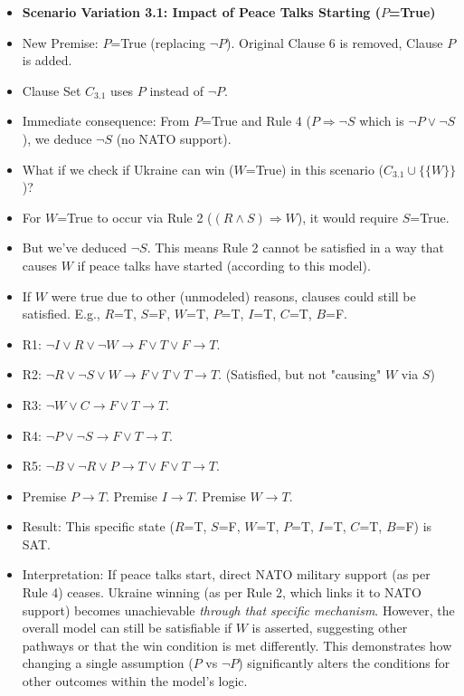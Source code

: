 \documentclass[11pt, a4paper]{article}
\begin{document}
\begin{itemize}
    \item \textbf{Scenario Variation 3.1: Impact of Peace Talks Starting ($P$=True)}
        \item New Premise: $P$=True (replacing $\neg P$). Original Clause 6 is removed, Clause $P$ is added.
        \item Clause Set $C_{3.1}$ uses $P$ instead of $\neg P$.
        \item Immediate consequence: From $P$=True and Rule 4 ($P \Rightarrow \neg S$ which is $\neg P \vee \neg S$), we deduce $\neg S$ (no NATO support).
        \item What if we check if Ukraine can win ($W$=True) in this scenario ($C_{3.1} \cup \{\{W\}\}$)?
            \item For $W$=True to occur via Rule 2 ($(R \wedge S) \Rightarrow W$), it would require $S$=True.
            \item But we've deduced $\neg S$. This means Rule 2 cannot be satisfied in a way that causes $W$ if peace talks have started (according to this model).
            \item If $W$ were true due to other (unmodeled) reasons, clauses could still be satisfied. E.g., $R$=T, $S$=F, $W$=T, $P$=T, $I$=T, $C$=T, $B$=F.
                \item R1: $\neg I \vee R \vee \neg W \rightarrow F \vee T \vee F \rightarrow T$.
                \item R2: $\neg R \vee \neg S \vee W \rightarrow F \vee T \vee T \rightarrow T$. (Satisfied, but not "causing" $W$ via $S$)
                \item R3: $\neg W \vee C \rightarrow F \vee T \rightarrow T$.
                \item R4: $\neg P \vee \neg S \rightarrow F \vee T \rightarrow T$.
                \item R5: $\neg B \vee \neg R \vee P \rightarrow T \vee F \vee T \rightarrow T$.
                \item Premise $P \rightarrow T$. Premise $I \rightarrow T$. Premise $W \rightarrow T$.
            \item Result: This specific state ($R$=T, $S$=F, $W$=T, $P$=T, $I$=T, $C$=T, $B$=F) is SAT.
        \item Interpretation: If peace talks start, direct NATO military support (as per Rule 4) ceases. Ukraine winning (as per Rule 2, which links it to NATO support) becomes unachievable \textit{through that specific mechanism}. However, the overall model can still be satisfiable if $W$ is asserted, suggesting other pathways or that the win condition is met differently. This demonstrates how changing a single assumption ($P$ vs $\neg P$) significantly alters the conditions for other outcomes within the model's logic.


\end{itemize}
\end{document}
